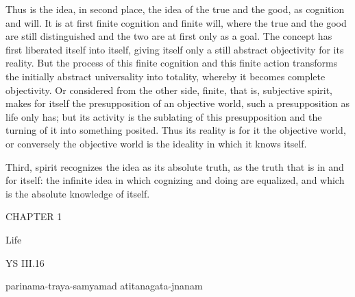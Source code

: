 Thus is the idea, in second place,
the idea of the true and the good,
as cognition and will.
It is at first finite cognition and finite will,
where the true and the good are still distinguished
and the two are at first only as a goal.
The concept has first liberated itself into itself,
giving itself only a still abstract objectivity for its reality.
But the process of this finite cognition and this finite action
transforms the initially abstract universality into totality,
whereby it becomes complete objectivity.
Or considered from the other side,
finite, that is, subjective spirit,
makes for itself the
presupposition of an objective world,
such a presupposition as life only has;
but its activity is the sublating of this presupposition
and the turning of it into something posited.
Thus its reality is for it the objective world,
or conversely the objective world is
the ideality in which it knows itself.

Third, spirit recognizes the idea as its absolute truth,
as the truth that is in and for itself:
the infinite idea in which cognizing and doing are equalized,
and which is the absolute knowledge of itself.

CHAPTER 1

Life

YS III.16

    parinama-traya-samyamad atitanagata-jnanam

